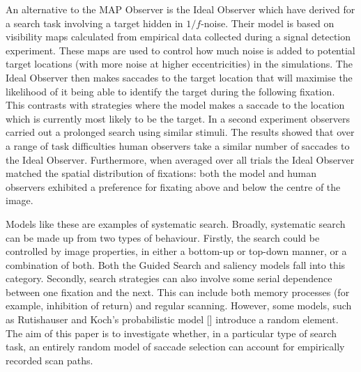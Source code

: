 An alternative to the MAP Observer is the Ideal Observer which \cite{najemnik-geisler2005, najemnik-geisler2008} have derived for a search task involving a target hidden in $1/f$-noise. Their model is based on visibility maps calculated from empirical data collected during a signal detection experiment. These maps are used to control how much noise is added to potential target locations (with more noise at higher eccentricities) in the simulations. The Ideal Observer then makes saccades to the target location that will maximise the likelihood of it being able to identify the target during the following fixation. This contrasts with strategies where the model makes a saccade to the location which is currently most likely to be the target. In a second experiment observers carried out a prolonged search using similar stimuli. The results showed that over a range of task difficulties human observers take a similar number of saccades to the Ideal Observer. Furthermore, when averaged over all trials the Ideal Observer matched the spatial distribution of fixations: both the model and human observers exhibited a preference for fixating above and below the centre of the image. 
\par
Models like these are examples of systematic search. Broadly, systematic search can be made up from two types of behaviour. Firstly, the search could be controlled by image properties, in either a bottom-up or top-down manner, or a combination of both. Both the Guided Search \citep{wolfe2007} and saliency \citep{itti-koch2000} models fall into this category. Secondly, search strategies can also involve some serial dependence between one fixation and the next. This can include both memory processes (for example, inhibition of return) and regular scanning. However, some models, such as Rutishauser and Koch's probabilistic model [\citeyear{rutishauser-koch2007}] introduce a random element. The aim of this paper is to investigate whether, in a particular type of search task, an entirely random model of saccade selection can account for empirically recorded scan paths.

